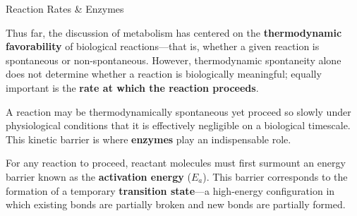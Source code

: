 \documentclass[10pt]{article}
\begin{document}
    \begin{core}{Reaction Rates \& Enzymes}

      Thus far, the discussion of metabolism has centered on the \textbf{thermodynamic favorability} of biological reactions---that is, whether a given reaction is spontaneous or non-spontaneous. However, thermodynamic spontaneity alone does not determine whether a reaction is biologically meaningful; equally important is the \textbf{rate at which the reaction proceeds}.

      A reaction may be thermodynamically spontaneous yet proceed so slowly under physiological conditions that it is effectively negligible on a biological timescale. This kinetic barrier is where \textbf{enzymes} play an indispensable role.

      For any reaction to proceed, reactant molecules must first surmount an energy barrier known as the \textbf{activation energy} ($E_a$). This barrier corresponds to the formation of a temporary \textbf{transition state}---a high-energy configuration in which existing bonds are partially broken and new bonds are partially formed.
      
    

\end{core}
\end{document}
